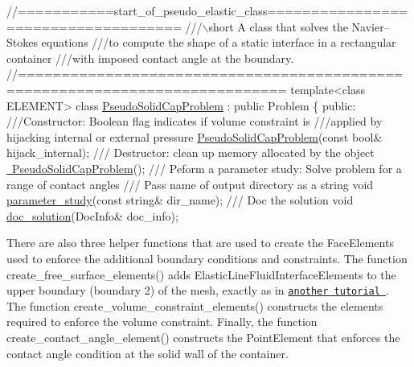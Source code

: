  
\begin{DoxyCodeInclude}
\textcolor{comment}{//===========start\_of\_pseudo\_elastic\_class====================================}
\textcolor{comment}{///\(\backslash\)short A class that solves the Navier--Stokes equations}
\textcolor{comment}{}\textcolor{comment}{///to compute the shape of a static interface in a rectangular container}
\textcolor{comment}{}\textcolor{comment}{///with imposed contact angle at the boundary.}
\textcolor{comment}{}\textcolor{comment}{//============================================================================}
\textcolor{keyword}{template}<\textcolor{keyword}{class} ELEMENT>
\textcolor{keyword}{class }\hyperlink{classPseudoSolidCapProblem}{PseudoSolidCapProblem} : \textcolor{keyword}{public} Problem
\{
\textcolor{keyword}{public}:
\textcolor{comment}{}
\textcolor{comment}{ ///Constructor: Boolean flag indicates if volume constraint is}
\textcolor{comment}{ ///applied by hijacking internal or external pressure}
\textcolor{comment}{} \hyperlink{classPseudoSolidCapProblem_a4ac05a07dd55950bb67f7f79cb9fbb77}{PseudoSolidCapProblem}(\textcolor{keyword}{const} \textcolor{keywordtype}{bool}& hijack\_internal);
\textcolor{comment}{}
\textcolor{comment}{ /// Destructor: clean up memory allocated by the object}
\textcolor{comment}{} \hyperlink{classPseudoSolidCapProblem_aec2a79e44dfd785b2978419210b053b8}{~PseudoSolidCapProblem}();
\textcolor{comment}{}
\textcolor{comment}{ /// Peform a parameter study: Solve problem for a range of contact angles}
\textcolor{comment}{ /// Pass name of output directory as a string}
\textcolor{comment}{} \textcolor{keywordtype}{void} \hyperlink{classPseudoSolidCapProblem_ae86ecaf62fa0920f5d14bf82a7f83b0e}{parameter\_study}(\textcolor{keyword}{const} \textcolor{keywordtype}{string}& dir\_name);
\textcolor{comment}{}
\textcolor{comment}{ /// Doc the solution}
\textcolor{comment}{} \textcolor{keywordtype}{void} \hyperlink{classPseudoSolidCapProblem_a2fb98a37bde5742cbdf3c91cb1f5eb2f}{doc\_solution}(DocInfo& doc\_info);

\end{DoxyCodeInclude}


There are also three helper functions that are used to create the {\ttfamily Face\+Elements} used to enforce the additional boundary conditions and constraints. The function {\ttfamily create\+\_\+free\+\_\+surface\+\_\+elements()} adds {\ttfamily Elastic\+Line\+Fluid\+Interface\+Elements} to the upper boundary (boundary 2) of the mesh, exactly as in \href{../../single_layer_free_surface/html/index.html}{\tt another tutorial }. The function {\ttfamily create\+\_\+volume\+\_\+constraint\+\_\+elements()} constructs the elements required to enforce the volume constraint. Finally, the function {\ttfamily create\+\_\+contact\+\_\+angle\+\_\+element()} constructs the {\ttfamily Point\+Element} that enforces the contact angle condition at the solid wall of the container.


